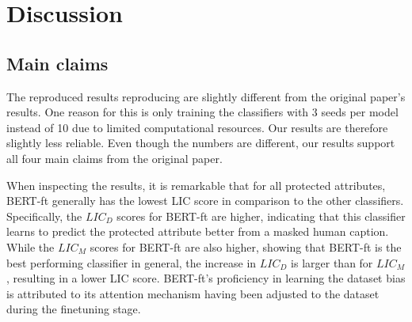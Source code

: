 \section{Discussion}
\label{sec:discussion}
\subsection{Main claims}
The reproduced results reproducing are slightly different from the original paper's results. One reason for this is only training the classifiers with 3 seeds per model instead of 10 due to limited computational resources. Our results are therefore slightly less reliable. Even though the numbers are different, our results support all four main claims from the original paper. 

When inspecting the results, it is remarkable that for all protected attributes, BERT-ft generally has the lowest LIC score in comparison to the other classifiers. Specifically, the $LIC_D$ scores for BERT-ft are higher, indicating that this classifier learns to predict the protected attribute better from a masked human caption. While the $LIC_M$ scores for BERT-ft are also higher, showing that BERT-ft is the best performing classifier in general, the increase in $LIC_D$ is larger than for $LIC_M$, resulting in a lower LIC score. BERT-ft's proficiency in learning the dataset bias is attributed to its attention mechanism having been adjusted to the dataset during the finetuning stage.


